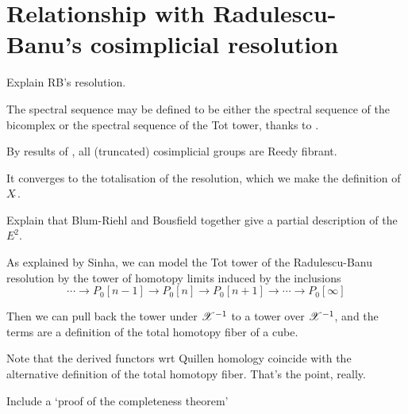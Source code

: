 \documentclass[11pt]{amsart}
\theoremstyle{plain}
\begin{document}
\section{Relationship with Radulescu-Banu's cosimplicial resolution}\label{sec:relnWithRB}
\begin{itemise}
\setlength{\parindent}{.25in}
\item Explain RB's resolution.
\item The spectral sequence may be defined to be either the spectral sequence of the bicomplex or the spectral sequence of the Tot tower, thanks to \cite[Lemma 2.2]{BousfieldHSSCS.pdf}.
\item By results of \cite[{X.4.9}]{YellowMonster}, all (truncated) cosimplicial groups are Reedy fibrant.
\item It converges to the totalisation of the resolution, which we make the definition of $X{\hat\,}$.
\item Explain that Blum-Riehl and Bousfield together give a partial description of the $E^2$.
\end{itemise}
\begin{itemise}
\setlength{\parindent}{.25in}
\item As explained by Sinha, we can model the Tot tower of the Radulescu-Banu resolution by the tower of homotopy limits induced by the inclusions
\[\cdots\to P_0[n-1]\to P_0[n]\to P_0[n+1]\to\cdots \to P_0[\infty]\]
\item Then we can pull back the tower under $\mathscr{X}^{-1}$ to a tower over $\mathscr{X}^{-1}$, and the terms are a definition of the total homotopy fiber of a cube.
\item Note that the derived functors wrt Quillen homology coincide with the alternative definition of the total homotopy fiber. That's the point, really.
\item Include a `proof of the completeness theorem'
\end{itemise}
\end{document}
